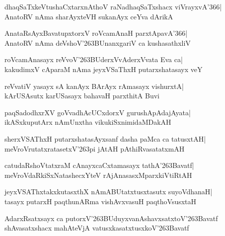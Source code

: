 \documentclass[twoside,12pt,openright]{book}
\newcounter{shloka}[chapter]
\begin{document}
\begin{shloka}%
dhaqSaTxkeVtushaCxtarxnAthoV raNadhaqSaTxshacx viVrayxvA\char'366|\\
AnatoRV nAma sharAyxteVH sukanAyx ceYva dArikA
\end{shloka}

\begin{shloka}%
AnataRsAyxBavatupxtorxV roVcamAnaH parxtApavA\char'366|\\
AnatoRV nAma deVshoV\char'263BUnanxgariV ca kushasathxliV
\end{shloka}

\begin{shloka}%
roVcamAnasayx reVvoV\char'263BUderxVvAderxVvata Eva ca|\\
kakudimxV cAparaM nAma jeyxVSaThxH putarxshatasayx veY
\end{shloka}

\begin{shloka}%
reVvatiV yasayx sA kanAyx BArAyx rAmasayx vishurxtA|\\
kArUSAsutx karUSasayx bahavaH parxthitA Buvi
\end{shloka}

\begin{shloka}%
paqSadodhxrXV goVvadhAcUCxdorxV gurushApAdajAyata|\\
ikASxkuputArx nAmUnxtha vikukiSxnimidaMDakAH
\end{shloka}

\begin{shloka}%
sherxVSAThxH putarxshatasAyxsanf dasha paMca ca tatusxtAH|\\
meVroVrutatxratasetxV\char'263pi jAtAH pAthiRvasatatxmAH
\end{shloka}

\begin{shloka}%
catudaRshoVtatxraM cAnayxcaCxtamasayx tathA\char'263Bavatf|
meVroVdaRkiSxNatashecxYteV rAjAnasasxMparxkiVtiRtAH
\end{shloka}

\begin{shloka}%
jeyxVSAThxtakxkutasxthX nAmABUtatxtusxtasutx suyoVdhanaH|\\
tasayx putarxH paqthunARma vishAvxvasuH paqthoVsusxtaH
\end{shloka}

\begin{shloka}%
AdarxRsatxsayx ca
putorxV\char'263BUduyxvanAshavxsatxtoV\char'263Bavatf\\
shAvasatxshacx mahAteVjA vatusxkasatxtusxkoV\char'263Bavatf
\end{shloka}
\end{document}
